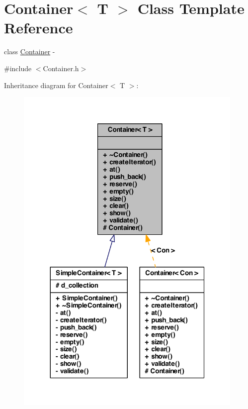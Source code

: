 \hypertarget{class_container}{
\section{Container$<$ T $>$ Class Template Reference}
\label{class_container}
}


class \hyperlink{class_container}{Container} -\/  




{\ttfamily \#include $<$Container.h$>$}



Inheritance diagram for Container$<$ T $>$:\nopagebreak
\begin{figure}[H]
\begin{center}
\leavevmode
\includegraphics[width=311pt]{class_container__inherit__graph}
\end{center}
\end{figure}

